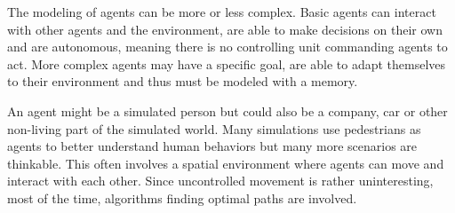 	The modeling of agents can be more or less complex.
	Basic agents can interact with other agents and the environment, are able to make decisions on their own and are autonomous, meaning there is no controlling unit commanding agents to act.
	More complex agents may have a specific goal, are able to adapt themselves to their environment and thus must be modeled with a memory.
	
	An agent might be a simulated person but could also be a company, car or other non-living part of the simulated world.
	Many simulations use pedestrians as agents to better understand human behaviors but many more scenarios are thinkable\cite[8]{macal2014introductory}.
	This often involves a spatial environment where agents can move and interact with each other.
	Since uncontrolled movement is rather uninteresting, most of the time, algorithms finding optimal paths are involved\cite{kneidl-borrmann-hartmann-navigation,gloor-hybrid-pedestrian-routing,teknomo-millonig-routing}.
	
